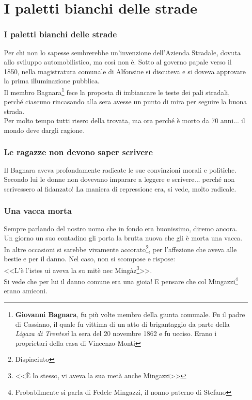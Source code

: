 
\chapter{I paletti bianchi delle strade}
\subsection{I paletti bianchi delle strade}
Per chi non lo sapesse sembrerebbe un'invenzione dell'Azienda Stradale, dovuta allo sviluppo automobilistico, ma così non è. Sotto al governo papale verso il 1850, nella magistratura comunale di Alfonsine si discuteva e si doveva approvare la prima illuminazione pubblica.\\
\indent Il membro Bagnara\footnote{\textbf{Giovanni Bagnara}, fu più volte membro della giunta comunale. Fu il padre di Cassiano, il quale fu vittima di un atto di brigantaggio  da parte della \textit{Ligaza di Trentesì} la sera del 20 novembre 1862 e fu ucciso. Erano i proprietari della casa di Vincenzo Monti} fece la proposta di imbiancare le teste dei pali stradali, perché ciascuno rincasando alla sera avesse un punto di mira per seguire la buona strada.\\
\indent Per molto tempo tutti risero della trovata, ma ora perché è morto da 70 anni... il mondo deve dargli ragione.

\subsection{Le ragazze non devono saper scrivere}
Il Bagnara aveva profondamente radicate le sue convinzioni morali e politiche. Secondo lui le donne non dovevano imparare a leggere e scrivere... perché non scrivessero al fidanzato! La maniera di repressione era, si vede, molto radicale.\\

\subsection{Una vacca morta}
Sempre parlando del nostro uomo che in fondo era buonissimo, diremo ancora.\\
\indent Un giorno un suo contadino gli porta la brutta nuova che gli è morta una vacca. In altre occasioni si sarebbe vivamente accorato\footnote{Dispiaciuto}, per l'affezione che aveva alle bestie e per il danno. Nel caso, non si scompose e rispose:\\
\indent <<L'è l'istes ui aveva la su mitè nec Mingàz\footnote{<<È lo stesso, vi aveva la sua metà anche Mingazzi>>}>>. \\
\indent Si vede che per lui il danno comune era una gioia! E pensare che col Mingazzi\footnote{Probabilmente si parla di Fedele Mingazzi, il nonno paterno di Stefano} erano amiconi.


